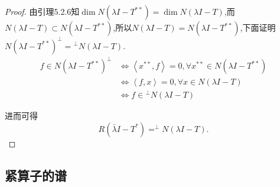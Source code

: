 \documentclass[lang=cn,newtx,10pt,scheme=chinese,thmcnt=chapter]{elegantbook}
\begin{document}
\begin{proof}
由引理5.2.6知$\dim  N{\left( {\lambda }I - {T}^{ ** }\right) }=\dim  N{\left( {\lambda }I - {T}\right) }$,而$ N{\left( {\lambda }I - {T}\right) }\subset  N{\left( {\lambda }I - {T}^{ ** }\right) }$,所以$ N{\left( {\lambda }I - {T}\right) }=  N{\left( {\lambda }I - {T}^{ ** }\right) }$,下面证明$N{\left( {\lambda }I - {T}^{ ** }\right) }^{ \bot  }={}^\bot N(\lambda I-T)$.
\begin{equation*}
    \begin{aligned}
        f\in N{\left( {\lambda }I - {T}^{ ** }\right) }^{ \bot  }&\Leftrightarrow \left\langle x^{**},f\right\rangle=0,\forall x^{**}\in N{\left( {\lambda }I - {T}^{ ** }\right) }\\
        &\Leftrightarrow \left\langle f,x\right\rangle=0,\forall x\in N{\left( {\lambda }I - {T}\right) }
        \\
        &\Leftrightarrow f\in {}^\bot N{\left( {\lambda }I - {T}\right) }
    \end{aligned}
\end{equation*}

进而可得\begin{equation*}
R\left( {\bar{\lambda }I - {T}^{ * }}\right) { = }^{ \bot  }N\left( {{\lambda I} - T}\right) .
\end{equation*}

\end{proof}




\subsection{紧算子的谱}
\end{document}
